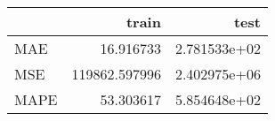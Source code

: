\begin{tabular}{lrr}
\toprule
{} &          train &          test \\
\midrule
MAE  &      16.916733 &  2.781533e+02 \\
MSE  &  119862.597996 &  2.402975e+06 \\
MAPE &      53.303617 &  5.854648e+02 \\
\bottomrule
\end{tabular}
